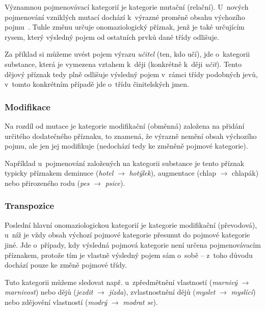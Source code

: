 Významnou pojmenovávací kategorií je kategorie mutační (relační).
U~nových pojmenování vzniklých mutací dochází k~výrazné proměně obsahu
výchozího pojmu~\parencite[102]{dokulil00}. Tuhle změnu určuje
onomaziologický příznak, jenž je také určujícím rysem, který výsledný
pojem od ostatních prvků dané třídy odlišuje.~\parencite{enc-mutace17}

Za příklad si můžeme uvést pojem výrazu \emph{učitel} (ten, kdo učí),
jde o~kategorii substance, která je vymezena vztahem k~ději (konkrétně
k~ději \emph{učit}). Tento dějový příznak tedy plně odlišuje výsledný
pojem v~rámci třídy podobných jevů, v~tomto konkrétním případě jde
o~třídu činitelských jmen.

\hypertarget{modifikace}{%
\subsubsection{Modifikace}\label{modifikace}}

Na rozdíl od mutace je kategorie modifikační (obměnná) založena na
přidání určitého dodatečného příznaku, to znamená, že výrazně nemění
obsah výchozího pojmu, ale jen jej modifikuje (nedochází tedy ke změněně
pojmové kategorie).~\parencite[102]{dokulil00}

Například u~pojmenování založených na kategorii substance je tento
příznak typicky příznakem deminuce (\emph{hotel} $\rightarrow$
\emph{hotýlek}), augmentace (chlap $\rightarrow$ chlapák) nebo
přirozeného rodu (\emph{pes} $\rightarrow$ \emph{psice}).

\hypertarget{transpozice}{%
\subsubsection{Transpozice}\label{transpozice}}

Poslední hlavní onomaziologickou kategorií je kategorie modifikační
(převodová), u~níž je vždy obsah výchozí pojmové kategorie přesunut do
pojmové kategorie jiné. Jde o~případy, kdy výsledná pojmová kategorie
není určena pojmenovávacím příznakem, protože tím je vlastně výsledný
pojem sám o~sobě -- z~toho důvodu dochází pouze ke změně pojmové třídy.
\parencite[103]{dokulil00}

Tuto kategorii můžeme sledovat např. u~zpředmětnění vlastností
(\emph{marnivý} $\rightarrow$ \emph{marnivost}) nebo dějů
(\emph{jezdit} $\rightarrow$ \emph{jízda}), zvlastnostnění dějů
(\emph{myslet} $\rightarrow$ \emph{myslící}) nebo zdějovění
vlastností (\emph{modrý} $\rightarrow$ \emph{modrat se}).


